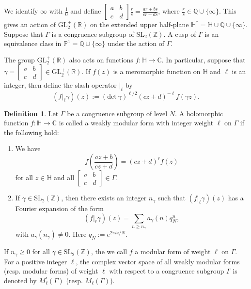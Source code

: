 \documentclass[reqno]{amsart}
\theoremstyle{definition}
\newtheorem{definition}[theorem]{Definition}
\theoremstyle{remark}
\numberwithin{equation}{section}
\begin{document}
We identify $\infty$ with $\displaystyle\frac{1}{0}$ and define $\begin{bmatrix}
a  &  b \\
c  &  d      
\end{bmatrix} \displaystyle\frac{r}{s}=\displaystyle \frac{ar+bs}{cr+ds}$, where $\displaystyle\frac{r}{s}\in \mathbb{Q}\cup\{\infty\}$.
This gives an action of $\text{GL}_2^{+}(\mathbb{R})$ on the extended upper half-plane $\mathbb{H}^{\ast}=\mathbb{H}\cup\mathbb{Q}\cup\{\infty\}$. 
Suppose that $\Gamma$ is a congruence subgroup of $\text{SL}_2(\mathbb{Z})$. A cusp of $\Gamma$ is an equivalence class in $\mathbb{P}^1=\mathbb{Q}\cup\{\infty\}$ under the action of $\Gamma$.
\par The group $\text{GL}_2^{+}(\mathbb{R})$ also acts on functions $f: \mathbb{H}\rightarrow \mathbb{C}$. In particular, suppose that $\gamma=\begin{bmatrix}
a  &  b \\
c  &  d      
\end{bmatrix}\in \text{GL}_2^{+}(\mathbb{R})$. If $f(z)$ is a meromorphic function on $\mathbb{H}$ and $\ell$ is an integer, then define the slash operator $|_{\ell}$ by 
$$(f|_{\ell}\gamma)(z):=(\text{det}~{\gamma})^{\ell/2}(cz+d)^{-\ell}f(\gamma z).$$
\begin{definition}
	Let $\Gamma$ be a congruence subgroup of level $N$. A holomorphic function $f: \mathbb{H}\rightarrow \mathbb{C}$ is called a weakly modular form with integer weight $\ell$ on $\Gamma$ if the following hold:
	\begin{enumerate}
		\item We have $$f\left(\displaystyle \frac{az+b}{cz+d}\right)=(cz+d)^{\ell}f(z)$$ for all $z\in \mathbb{H}$ and all $\begin{bmatrix}
		a  &  b \\
		c  &  d      
		\end{bmatrix} \in \Gamma$.
		\item If $\gamma\in \text{SL}_2(\mathbb{Z})$, then there exists an integer $n_{\gamma}$ such that  $(f|_{\ell}\gamma)(z)$ has a Fourier expansion of the form $$(f|_{\ell}\gamma)(z)=\displaystyle\sum_{n\geq n_{\gamma}}a_{\gamma}(n)q_N^n,$$
		with $a_{\gamma}(n_{\gamma})\neq 0$. Here $q_N:=e^{2\pi iz/N}$.
	\end{enumerate}
\end{definition}
If $n_{\gamma}\geq 0$ for all $\gamma\in \text{SL}_2(\mathbb{Z})$, the we call $f$ a modular form of weight $\ell$ on $\Gamma$. 
For a positive integer $\ell$, the complex vector space of all weakly modular forms (resp. modular forms) of weight $\ell$ with respect to a congruence subgroup $\Gamma$ is denoted by $M^{!}_{\ell}(\Gamma)$ (resp. $M_{\ell}(\Gamma)$).
\end{document}
